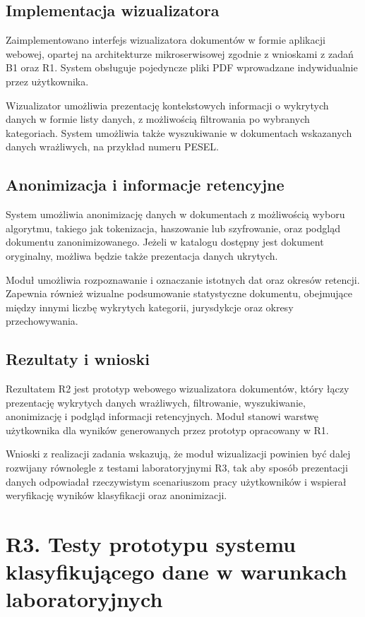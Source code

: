 \documentclass[12pt,a4paper]{report}
\begin{document}
\subsection{Implementacja wizualizatora}
Zaimplementowano interfejs wizualizatora dokumentów w formie aplikacji webowej, opartej na architekturze mikroserwisowej zgodnie z wnioskami z zadań B1 oraz R1. System obsługuje pojedyncze pliki PDF wprowadzane indywidualnie przez użytkownika.

Wizualizator umożliwia prezentację kontekstowych informacji o wykrytych danych w formie listy danych, z możliwością filtrowania po wybranych kategoriach. System umożliwia także wyszukiwanie w dokumentach wskazanych danych wrażliwych, na przykład numeru PESEL.

\subsection{Anonimizacja i informacje retencyjne}
System umożliwia anonimizację danych w dokumentach z możliwością wyboru algorytmu, takiego jak tokenizacja, haszowanie lub szyfrowanie, oraz podgląd dokumentu zanonimizowanego. Jeżeli w katalogu dostępny jest dokument oryginalny, możliwa będzie także prezentacja danych ukrytych.

Moduł umożliwia rozpoznawanie i oznaczanie istotnych dat oraz okresów retencji. Zapewnia również wizualne podsumowanie statystyczne dokumentu, obejmujące między innymi liczbę wykrytych kategorii, jurysdykcje oraz okresy przechowywania.

\subsection{Rezultaty i wnioski}
Rezultatem R2 jest prototyp webowego wizualizatora dokumentów, który łączy prezentację wykrytych danych wrażliwych, filtrowanie, wyszukiwanie, anonimizację i podgląd informacji retencyjnych. Moduł stanowi warstwę użytkownika dla wyników generowanych przez prototyp opracowany w R1.

Wnioski z realizacji zadania wskazują, że moduł wizualizacji powinien być dalej rozwijany równolegle z testami laboratoryjnymi R3, tak aby sposób prezentacji danych odpowiadał rzeczywistym scenariuszom pracy użytkowników i wspierał weryfikację wyników klasyfikacji oraz anonimizacji.

\section{R3. Testy prototypu systemu klasyfikującego dane w warunkach laboratoryjnych}
\end{document}
